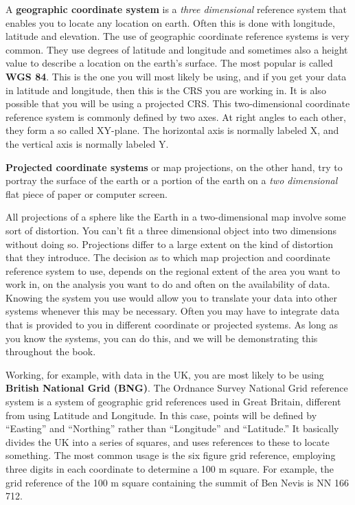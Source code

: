 \documentclass[
]{book}
\begin{document}
A \textbf{geographic coordinate system} is a \emph{three dimensional} reference system that enables you to locate any location on earth. Often this is done with longitude, latitude and elevation. The use of geographic coordinate reference systems is very common. They use degrees of latitude and longitude and sometimes also a height value to describe a location on the earth's surface. The most popular is called \textbf{WGS 84}. This is the one you will most likely be using, and if you get your data in latitude and longitude, then this is the CRS you are working in. It is also possible that you will be using a projected CRS. This two-dimensional coordinate reference system is commonly defined by two axes. At right angles to each other, they form a so called XY-plane. The horizontal axis is normally labeled X, and the vertical axis is normally labeled Y.

\textbf{Projected coordinate systems} or map projections, on the other hand, try to portray the surface of the earth or a portion of the earth on a \emph{two dimensional} flat piece of paper or computer screen.

All projections of a sphere like the Earth in a two-dimensional map involve some sort of distortion. You can't fit a three dimensional object into two dimensions without doing so. Projections differ to a large extent on the kind of distortion that they introduce. The decision as to which map projection and coordinate reference system to use, depends on the regional extent of the area you want to work in, on the analysis you want to do and often on the availability of data. Knowing the system you use would allow you to translate your data into other systems whenever this may be necessary. Often you may have to integrate data that is provided to you in different coordinate or projected systems. As long as you know the systems, you can do this, and we will be demonstrating this throughout the book.

Working, for example, with data in the UK, you are most likely to be using \textbf{British National Grid (BNG)}. The Ordnance Survey National Grid reference system is a system of geographic grid references used in Great Britain, different from using Latitude and Longitude. In this case, points will be defined by ``Easting'' and ``Northing'' rather than ``Longitude'' and ``Latitude.'' It basically divides the UK into a series of squares, and uses references to these to locate something. The most common usage is the six figure grid reference, employing three digits in each coordinate to determine a 100 m square. For example, the grid reference of the 100 m square containing the summit of Ben Nevis is NN 166 712.
\end{document}
